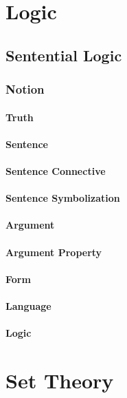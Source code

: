 \documentclass{book}
\begin{document}
\maketitle
\tableofcontents
\part{Logic}
			
	\chapter{Sentential Logic}
		\section{Notion}
			\subsection*{Truth}
			
			\subsection*{Sentence}
			
			\subsection*{Sentence Connective}
			
			\subsection*{Sentence Symbolization}
			
			\subsection*{Argument}
			
			\subsection*{Argument Property}
			
			\subsection*{Form}
			
			\subsection*{Language}
			
			\subsection*{Logic}
			
\part{Set Theory}
\end{document}
